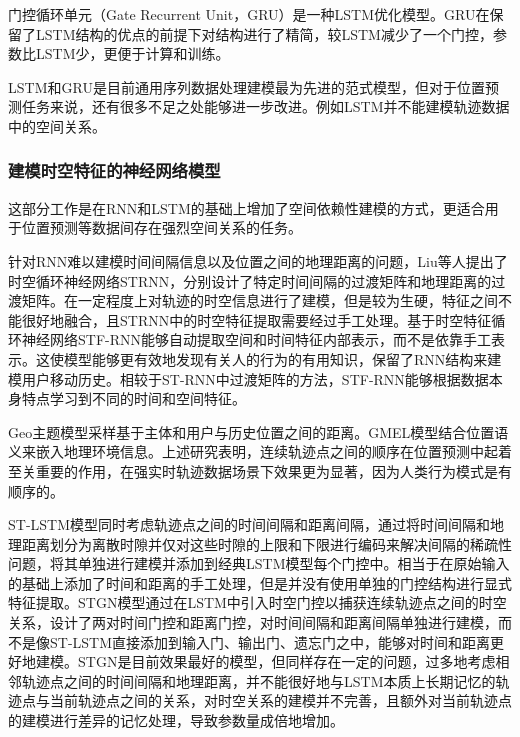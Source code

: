 \documentclass[master]{thesis-uestc}
\begin{document}
门控循环单元（Gate Recurrent Unit，GRU）是一种LSTM优化模型。GRU在保留了LSTM结构的优点的前提下对结构进行了精简，较LSTM减少了一个门控，参数比LSTM少，更便于计算和训练。

LSTM和GRU是目前通用序列数据处理建模最为先进的范式模型，但对于位置预测任务来说，还有很多不足之处能够进一步改进。例如LSTM并不能建模轨迹数据中的空间关系。

\subsubsection{建模时空特征的神经网络模型}
这部分工作是在RNN和LSTM的基础上增加了空间依赖性建模的方式，更适合用于位置预测等数据间存在强烈空间关系的任务。

针对RNN难以建模时间间隔信息以及位置之间的地理距离的问题，Liu等人提出了时空循环神经网络STRNN，分别设计了特定时间间隔的过渡矩阵和地理距离的过渡矩阵。在一定程度上对轨迹的时空信息进行了建模，但是较为生硬，特征之间不能很好地融合，且STRNN中的时空特征提取需要经过手工处理。基于时空特征循环神经网络STF-RNN能够自动提取空间和时间特征内部表示，而不是依靠手工表示。这使模型能够更有效地发现有关人的行为的有用知识，保留了RNN结构来建模用户移动历史。相较于ST-RNN中过渡矩阵的方法，STF-RNN能够根据数据本身特点学习到不同的时间和空间特征。

Geo主题模型采样基于主体和用户与历史位置之间的距离。GMEL模型结合位置语义来嵌入地理环境信息。上述研究表明，连续轨迹点之间的顺序在位置预测中起着至关重要的作用，在强实时轨迹数据场景下效果更为显著，因为人类行为模式是有顺序的。

ST-LSTM模型同时考虑轨迹点之间的时间间隔和距离间隔，通过将时间间隔和地理距离划分为离散时隙并仅对这些时隙的上限和下限进行编码来解决间隔的稀疏性问题，将其单独进行建模并添加到经典LSTM模型每个门控中。相当于在原始输入的基础上添加了时间和距离的手工处理，但是并没有使用单独的门控结构进行显式特征提取。STGN模型通过在LSTM中引入时空门控以捕获连续轨迹点之间的时空关系，设计了两对时间门控和距离门控，对时间间隔和距离间隔单独进行建模，而不是像ST-LSTM直接添加到输入门、输出门、遗忘门之中，能够对时间和距离更好地建模。STGN是目前效果最好的模型，但同样存在一定的问题，过多地考虑相邻轨迹点之间的时间间隔和地理距离，并不能很好地与LSTM本质上长期记忆的轨迹点与当前轨迹点之间的关系，对时空关系的建模并不完善，且额外对当前轨迹点的建模进行差异的记忆处理，导致参数量成倍地增加。
\end{document}

